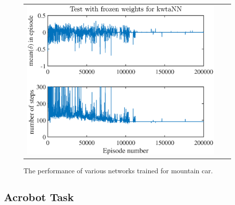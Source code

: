 \documentclass[preprint,12pt,authoryear]{elsarticle}
\begin{document}
\begin{figure}
\begin{center}
\begin{tabular}[h]{ccc}
\includegraphics[scale=0.2]{figures/mountainCar-kwtaNN-frozen-test.eps}    
\end{tabular}
\end{center}
\caption{The performance of various networks trained for mountain car.} 
\label{bigresults}
\end{figure}






\subsection{Acrobot Task}
\label{sub:acrobot_results}
\end{document}
